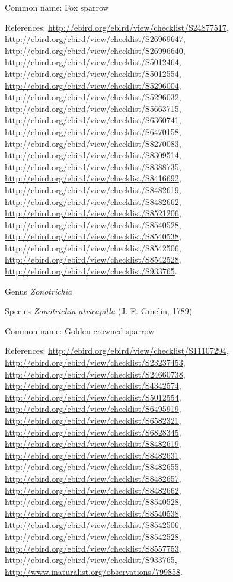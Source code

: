 \documentclass[9pt, article]{memoir}
\begin{document}
\begin{multicols}{2}
Common name: Fox sparrow

References: 
\url{http://ebird.org/ebird/view/checklist/S24877517}, 
\url{http://ebird.org/ebird/view/checklist/S26969647}, 
\url{http://ebird.org/ebird/view/checklist/S26996640}, 
\url{http://ebird.org/ebird/view/checklist/S5012464}, 
\url{http://ebird.org/ebird/view/checklist/S5012554}, 
\url{http://ebird.org/ebird/view/checklist/S5296004}, 
\url{http://ebird.org/ebird/view/checklist/S5296032}, 
\url{http://ebird.org/ebird/view/checklist/S5663715}, 
\url{http://ebird.org/ebird/view/checklist/S6360741}, 
\url{http://ebird.org/ebird/view/checklist/S6470158}, 
\url{http://ebird.org/ebird/view/checklist/S8270083}, 
\url{http://ebird.org/ebird/view/checklist/S8309514}, 
\url{http://ebird.org/ebird/view/checklist/S8388735}, 
\url{http://ebird.org/ebird/view/checklist/S8416692}, 
\url{http://ebird.org/ebird/view/checklist/S8482619}, 
\url{http://ebird.org/ebird/view/checklist/S8482662}, 
\url{http://ebird.org/ebird/view/checklist/S8521206}, 
\url{http://ebird.org/ebird/view/checklist/S8540528}, 
\url{http://ebird.org/ebird/view/checklist/S8540538}, 
\url{http://ebird.org/ebird/view/checklist/S8542506}, 
\url{http://ebird.org/ebird/view/checklist/S8542528}, 
\url{http://ebird.org/ebird/view/checklist/S933765}.

\vspace{6pt}\noindent\hspace{30pt}Genus \textit{Zonotrichia}


\vspace{6pt}\noindent\hspace{36pt}Species \textit{Zonotrichia atricapilla} (J. F. Gmelin, 1789)


Common name: Golden-crowned sparrow

References: 
\url{http://ebird.org/ebird/view/checklist/S11107294}, 
\url{http://ebird.org/ebird/view/checklist/S23237453}, 
\url{http://ebird.org/ebird/view/checklist/S24660738}, 
\url{http://ebird.org/ebird/view/checklist/S4342574}, 
\url{http://ebird.org/ebird/view/checklist/S5012554}, 
\url{http://ebird.org/ebird/view/checklist/S6495919}, 
\url{http://ebird.org/ebird/view/checklist/S6582321}, 
\url{http://ebird.org/ebird/view/checklist/S6828345}, 
\url{http://ebird.org/ebird/view/checklist/S8482619}, 
\url{http://ebird.org/ebird/view/checklist/S8482631}, 
\url{http://ebird.org/ebird/view/checklist/S8482655}, 
\url{http://ebird.org/ebird/view/checklist/S8482657}, 
\url{http://ebird.org/ebird/view/checklist/S8482662}, 
\url{http://ebird.org/ebird/view/checklist/S8540528}, 
\url{http://ebird.org/ebird/view/checklist/S8540538}, 
\url{http://ebird.org/ebird/view/checklist/S8542506}, 
\url{http://ebird.org/ebird/view/checklist/S8542528}, 
\url{http://ebird.org/ebird/view/checklist/S8557753}, 
\url{http://ebird.org/ebird/view/checklist/S933765}, 
\url{http://www.inaturalist.org/observations/799858}.


\end{multicols}
\end{document}
